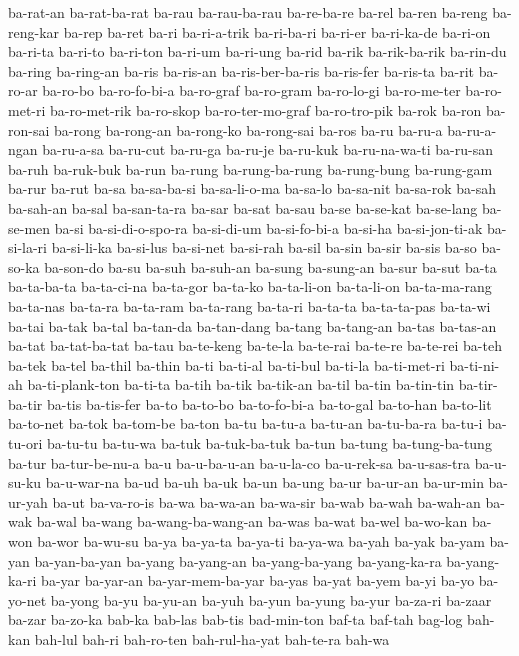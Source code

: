 {ba-rat-an ba-rat-ba-rat ba-rau ba-rau-ba-rau ba-re-ba-re ba-rel ba-ren
ba-reng ba-reng-kar ba-rep ba-ret ba-ri ba-ri-a-trik ba-ri-ba-ri ba-ri-er
ba-ri-ka-de ba-ri-on ba-ri-ta ba-ri-to ba-ri-ton ba-ri-um ba-ri-ung ba-rid
ba-rik ba-rik-ba-rik ba-rin-du ba-ring ba-ring-an ba-ris ba-ris-an
ba-ris-ber-ba-ris ba-ris-fer ba-ris-ta ba-rit ba-ro-ar ba-ro-bo
ba-ro-fo-bi-a ba-ro-graf ba-ro-gram ba-ro-lo-gi ba-ro-me-ter ba-ro-met-ri
ba-ro-met-rik ba-ro-skop ba-ro-ter-mo-graf ba-ro-tro-pik ba-rok ba-ron
ba-ron-sai ba-rong ba-rong-an ba-rong-ko ba-rong-sai ba-ros ba-ru ba-ru-a
ba-ru-a-ngan ba-ru-a-sa ba-ru-cut ba-ru-ga ba-ru-je ba-ru-kuk
ba-ru-na-wa-ti ba-ru-san ba-ruh ba-ruk-buk ba-run ba-rung ba-rung-ba-rung
ba-rung-bung ba-rung-gam ba-rur ba-rut ba-sa ba-sa-ba-si ba-sa-li-o-ma
ba-sa-lo ba-sa-nit ba-sa-rok ba-sah ba-sah-an ba-sal ba-san-ta-ra ba-sar
ba-sat ba-sau ba-se ba-se-kat ba-se-lang ba-se-men ba-si ba-si-di-o-spo-ra
ba-si-di-um ba-si-fo-bi-a ba-si-ha ba-si-jon-ti-ak ba-si-la-ri ba-si-li-ka
ba-si-lus ba-si-net ba-si-rah ba-sil ba-sin ba-sir ba-sis ba-so ba-so-ka
ba-son-do ba-su ba-suh ba-suh-an ba-sung ba-sung-an ba-sur ba-sut ba-ta
ba-ta-ba-ta ba-ta-ci-na ba-ta-gor ba-ta-ko ba-ta-li-on ba-ta-li-on
ba-ta-ma-rang ba-ta-nas ba-ta-ra ba-ta-ram ba-ta-rang ba-ta-ri ba-ta-ta
ba-ta-ta-pas ba-ta-wi ba-tai ba-tak ba-tal ba-tan-da ba-tan-dang ba-tang
ba-tang-an ba-tas ba-tas-an ba-tat ba-tat-ba-tat ba-tau ba-te-keng
ba-te-la ba-te-rai ba-te-re ba-te-rei ba-teh ba-tek ba-tel ba-thil ba-thin
ba-ti ba-ti-al ba-ti-bul ba-ti-la ba-ti-met-ri ba-ti-ni-ah ba-ti-plank-ton
ba-ti-ta ba-tih ba-tik ba-tik-an ba-til ba-tin ba-tin-tin ba-tir-ba-tir
ba-tis ba-tis-fer ba-to ba-to-bo ba-to-fo-bi-a ba-to-gal ba-to-han
ba-to-lit ba-to-net ba-tok ba-tom-be ba-ton ba-tu ba-tu-a ba-tu-an
ba-tu-ba-ra ba-tu-i ba-tu-ori ba-tu-tu ba-tu-wa ba-tuk ba-tuk-ba-tuk
ba-tun ba-tung ba-tung-ba-tung ba-tur ba-tur-be-nu-a ba-u ba-u-ba-u-an
ba-u-la-co ba-u-rek-sa ba-u-sas-tra ba-u-su-ku ba-u-war-na ba-ud ba-uh
ba-uk ba-un ba-ung ba-ur ba-ur-an ba-ur-min ba-ur-yah ba-ut ba-va-ro-is
ba-wa ba-wa-an ba-wa-sir ba-wab ba-wah ba-wah-an ba-wak ba-wal ba-wang
ba-wang-ba-wang-an ba-was ba-wat ba-wel ba-wo-kan ba-won ba-wor ba-wu-su
ba-ya ba-ya-ta ba-ya-ti ba-ya-wa ba-yah ba-yak ba-yam ba-yan ba-yan-ba-yan
ba-yang ba-yang-an ba-yang-ba-yang ba-yang-ka-ra ba-yang-ka-ri ba-yar
ba-yar-an ba-yar-mem-ba-yar ba-yas ba-yat ba-yem ba-yi ba-yo ba-yo-net
ba-yong ba-yu ba-yu-an ba-yuh ba-yun ba-yung ba-yur ba-za-ri ba-zaar
ba-zar ba-zo-ka bab-ka bab-las bab-tis bad-min-ton baf-ta baf-tah bag-log
bah-kan bah-lul bah-ri bah-ro-ten bah-rul-ha-yat bah-te-ra bah-wa
}
